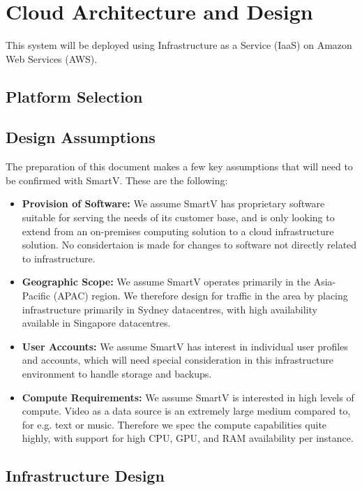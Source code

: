 \section{Cloud Architecture and Design}

This system will be deployed using Infrastructure as a Service (IaaS) on Amazon Web Services (AWS).

\subsection{Platform Selection}



\subsection{Design Assumptions}

The preparation of this document makes a few key assumptions that will need to be confirmed with SmartV. These are the following: 

\begin{itemize}
    \item \textbf{Provision of Software:} We assume SmartV has proprietary software suitable for serving the needs of its customer base, and is only looking to extend from an on-premises computing solution to a cloud infrastructure solution. No considertaion is made for changes to software not directly related to infrastructure.
    \item \textbf{Geographic Scope:} We assume SmartV operates primarily in the Asia-Pacific (APAC) region. We therefore design for traffic in the area by placing infrastructure primarily in Sydney datacentres, with high availability available in Singapore datacentres.
    \item \textbf{User Accounts:} We assume SmartV has interest in individual user profiles and accounts, which will need special consideration in this infrastructure environment to handle storage and backups.
    \item \textbf{Compute Requirements:} We assume SmartV is interested in high levels of compute. Video as a data source is an extremely large medium compared to, for e.g. text or music. Therefore we spec the compute capabilities quite highly, with support for high CPU, GPU, and RAM availability per instance.
\end{itemize}

\subsection{Infrastructure Design}

